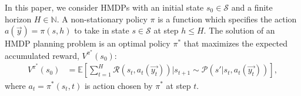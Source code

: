 In this paper, we consider HMDPs with an initial state $s_0 \in \mathcal{S}$ and a finite horizon $H \in \mathbb{N}$.
A non-stationary policy $\pi$ is a function which specifies the action $a(\vec{y}) = \pi(s, h)$ to take in state $s \in \mathcal{S}$ at step $h \leq H$.
The solution of an HMDP planning problem is an optimal policy $\pi^*$ that maximizes the expected accumulated reward, $V^{\pi^*}(s_0)$:
\begin{align}
V^{\pi^*} (s_0) & = \mathbb{E} \left[ \sum_{t=1}^{H} \mathcal{R}(s_t, a_t(\vec{y_t})) \Big| s_{t+1} \sim \mathcal{P}(s'|s_{t},a_t(\vec{y_t})) \right], \label{eq:vfun_def}
\end{align}
where $a_t = \pi^*(s_t,t)$ is action chosen by $\pi^*$ at step $t$.

